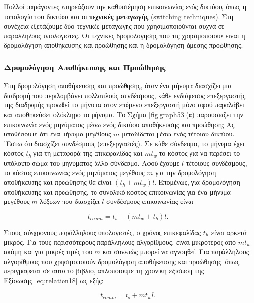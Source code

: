 \documentclass[12pt,a4paper]{article} %
\begin{document}
Πολλοί παράγοντες επηρεάζουν την καθυστέρηση επικοινωνίας ενός δικτύου, 
όπως η τοπολογία του δικτύου και οι \textbf{τεχνικές μεταγωγής} 
(switching techniques). Στη συνέχεια 
εξετάζουμε δύο τεχνικές μεταγωγής που χρησιμοποιούνται συχνά σε παράλληλους 
υπολογιστές. Οι τεχνικές δρομολόγησης που τις χρησιμοποιούν είναι η 
δρομολόγηση αποθήκευσης και προώθησης και η δρομολόγηση άμεσης προώθησης.

\subsubsection{Δρομολόγηση Αποθήκευσης και Προώθησης}
Στη δρομολόγηση αποθήκευσης και προώθησης, όταν ένα μήνυμα διασχίζει μια 
διαδρομή που περιλαμβάνει πολλαπλούς συνδέσμους, κάθε ενδιάμεσος επεξεργαστής 
της διαδρομής προωθεί το μήνυμα στον επόμενο επεξεργαστή μόνο αφού
παραλάβει και αποθηκεύσει ολόκληρο το μήνυμα. Το Σχήμα \ref{fig:graph53}(α) 
παρουσιάζει την επικοινωνία ενός μηνύματος μέσω ενός δικτύου αποθήκευσης και 
προώθησης
Ας υποθέσουμε ότι ένα μήνυμα μεγέθους $m$ μεταδίδεται μέσω ενός τέτοιου 
δικτύου. ΄Εστω ότι διασχίζει συνδέσμους (επεξεργαστές). Σε κάθε σύνδεσμο, 
το μήνυμα έχει κόστος $t_h$ για τη μεταφορά της επικεφαλίδας και $m t_w$ 
το κόστος για να περάσει το υπόλοιπο σώμα του μηνύματος άλλο σύνδεσμο. 
Αφού έχουμε $l$ τέτοιους συνδέσμους, το κόστος επικοινωνίας ενός μηνύματος 
μεγέθους $m$ για την δρομολόγηση αποθήκευσης και προώθησης θα είναι 
$(t_h + m t_w)l$. Επομένως, για δρομολόγηση αποθήκευσης και προώθησης, το 
συνολικό κόστος επικοινωνίας για ένα μήνυμα μεγέθους $m$ λέξεων που 
διασχίζει $l$ συνδέσμους επικοινωνίας είναι

\begin{equation}
t_{comm} = t_s + (m t_w + t_h)l.
\label{eq:relation18}
\end{equation}

\noindent Στους σύγχρονους παράλληλους υπολογιστές, ο χρόνος επικεφαλίδας
$t_h$ είναι αρκετά μικρός. Για τους περισσότερους παράλληλους αλγορίθμους,
είναι μικρότερος από $m t_w$ ακόμη και για μικρές τιμές του $m$ και
συνεπώς μπορεί να αγνοηθεί. Για παράλληλους αλγορίθμους που χρησιμοποιούν
δρομολόγηση αποθήκευσης και προώθησης, όπως περιγράφεται σε αυτό το βιβλίο,
απλοποιούμε τη χρονική εξίσωση της Εξίσωσης~\ref{eq:relation18} ως εξής:

\[
t_{comm} = t_s + m t_w l.
\]
\end{document}
